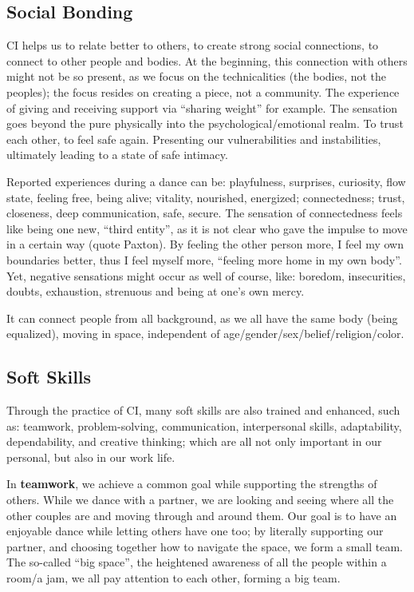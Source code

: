 \subsection{Social Bonding}\label{subsec:social-bonding}

CI helps us to relate better to others, to create strong social connections, to connect to other people and bodies.
At the beginning, this connection with others might not be so present, as we focus on the technicalities (the bodies, not the peoples); the focus resides on creating a piece, not a community.
The experience of giving and receiving support via ``sharing weight'' for example.
The sensation goes beyond the pure physically into the psychological/emotional realm.
To trust each other, to feel safe again.
Presenting our vulnerabilities and instabilities, ultimately leading to a state of safe intimacy.

Reported experiences during a dance can be: playfulness, surprises, curiosity, flow state, feeling free, being alive; vitality, nourished, energized; connectedness; trust, closeness, deep communication, safe, secure.
The sensation of connectedness feels like being one new, ``third entity'', as it is not clear who gave the impulse to move in a certain way (quote Paxton).
By feeling the other person more, I feel my own boundaries better, thus I feel myself more, ``feeling more home in my own body''.
Yet, negative sensations might occur as well of course, like: boredom, insecurities, doubts, exhaustion, strenuous and being at one's own mercy.

It can connect people from all background, as we all have the same body (being equalized), moving in space, independent of age/gender/sex/belief/religion/color.

\subsection{Soft Skills}\label{subsec:soft-skills}

Through the practice of CI, many soft skills are also trained and enhanced, such as: teamwork, problem-solving, communication, interpersonal skills, adaptability, dependability, and creative thinking; which are all not only important in our personal, but also in our work life.

In \textbf{teamwork}, we achieve a common goal while supporting the strengths of others.
While we dance with a partner, we are looking and seeing where all the other couples are and moving through and around them.
Our goal is to have an enjoyable dance while letting others have one too;
by literally supporting our partner, and choosing together how to navigate the space, we form a small team.
The so-called ``big space'', the heightened awareness of all the people within a room/a jam, we all pay attention to each other, forming a big team.

